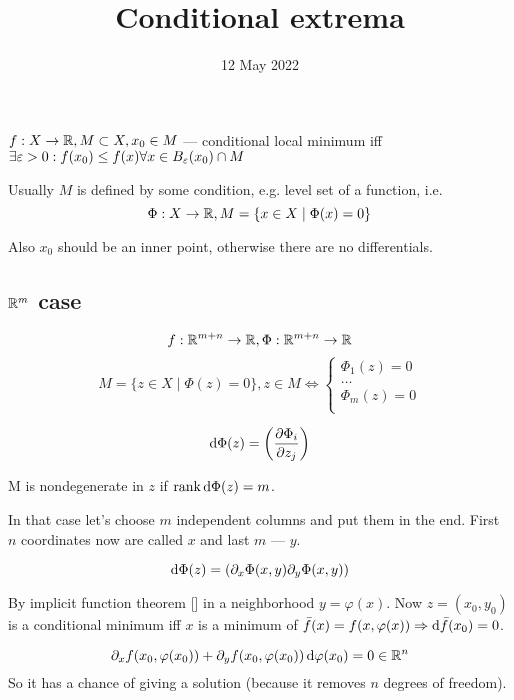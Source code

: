 
\title{Conditional extrema}
\author{}
\date{12 May 2022}

\maketitle

\begin{df} $f: X \to \mathbb R, M \subset X, x_0 \in M$ --- conditional local minimum iff
$\exists \varepsilon > 0: f(x_0) \leq f(x) \forall x \in B_{\varepsilon}(x_0) \cap M$ \end{df}

Usually $M$ is defined by some condition, e.g. level set of a function, i.e. 
\[ \Phi: X \to \mathbb R, M = \{ x \in X \mid \Phi(x) = 0 \} \] 

Also $x_0$ should be an inner point, otherwise there are no differentials.

\subsection*{$\mathbb R^m$ case}

\[ f: \mathbb R^{m+n} \to \mathbb R, \Phi: \mathbb R^{m+n} \to \mathbb R \] 
\[ M = \{ z \in X \mid \Phi(z) = 0 \}, z \in M \iff \begin{cases}
    \Phi_1(z) = 0 \\
    \dots \\ 
    \Phi_m(z) = 0 \\
\end{cases} \]

\[ \dd{\Phi(z)} = \qty( \pdv{\Phi_i}{z_j} ) \]

\begin{df} M is nondegenerate in $z$ if $\rank \dd{\Phi(z)} = m$. \end{df}

In that case let's choose $m$ independent
columns and put them in the end. First $n$ coordinates now are called $x$ and last $m$ --- $y$.

\[ \dd{\Phi(z)} = \qty( \partial_x \Phi(x, y) \partial_y \Phi(x, y)) \]

By implicit function theorem [] in a neighborhood $y = \varphi(x)$.
Now $z = (x_0, y_0)$ is a conditional minimum iff $x$ is a minimum of $\bar f(x) = f(x, \varphi(x)) \Rightarrow \dd{\bar f(x_0)} = 0$.

\[ \partial_x f(x_0, \varphi(x_0)) + \partial_y f(x_0, \varphi(x_0)) \dd{\varphi(x_0)} = 0 \in \mathbb R^n \]
So it has a chance of giving a solution (because it removes $n$ degrees of freedom).

